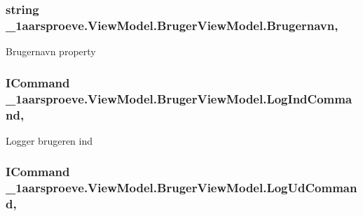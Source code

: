\subsubsection[{Brugernavn}]{\setlength{\rightskip}{0pt plus 5cm}string \+\_\+1aarsproeve.\+View\+Model.\+Bruger\+View\+Model.\+Brugernavn\hspace{0.3cm}{\ttfamily [get]}, {\ttfamily [set]}}\label{class__1aarsproeve_1_1_view_model_1_1_bruger_view_model_a63b4a8aa59a8e3e2ec0d7285c2ce6caa}


Brugernavn property 

\hypertarget{class__1aarsproeve_1_1_view_model_1_1_bruger_view_model_a40fed761861b9387bc47a92a2f1e55fd}{}
\subsubsection[{Log\+Ind\+Command}]{\setlength{\rightskip}{0pt plus 5cm}I\+Command \+\_\+1aarsproeve.\+View\+Model.\+Bruger\+View\+Model.\+Log\+Ind\+Command\hspace{0.3cm}{\ttfamily [get]}, {\ttfamily [set]}}\label{class__1aarsproeve_1_1_view_model_1_1_bruger_view_model_a40fed761861b9387bc47a92a2f1e55fd}


Logger brugeren ind 

\hypertarget{class__1aarsproeve_1_1_view_model_1_1_bruger_view_model_afc1d332a62edcc717d3e1764db42c89a}{}
\subsubsection[{Log\+Ud\+Command}]{\setlength{\rightskip}{0pt plus 5cm}I\+Command \+\_\+1aarsproeve.\+View\+Model.\+Bruger\+View\+Model.\+Log\+Ud\+Command\hspace{0.3cm}{\ttfamily [get]}, {\ttfamily [set]}}\label{class__1aarsproeve_1_1_view_model_1_1_bruger_view_model_afc1d332a62edcc717d3e1764db42c89a}


